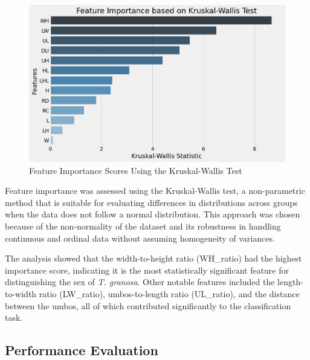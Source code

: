 \begin{figure}[!htbp]
	\centering
	\includegraphics[width=1.0\textwidth]{figures/kw.png}
	\caption{Feature Importance Scores Using the Kruskal-Wallis Test}
	\label{fig:kw}
\end{figure}

Feature importance was assessed using the Kruskal-Wallis test, a non-parametric method that is suitable for evaluating differences in distributions across groups when the data does not follow a normal distribution. This approach was chosen because of the non-normality of the dataset and its robustness in handling continuous and ordinal data without assuming homogeneity of variances. \cite{ribeiro2024}

The analysis showed that the width-to-height ratio (WH\_ratio) had the highest importance score, indicating it is the most statistically significant feature for distinguishing the sex of \textit{T. granosa}. Other notable features included the length-to-width ratio (LW\_ratio), umbos-to-length ratio (UL\_ratio), and the distance between the umbos, all of which contributed significantly to the classification task.

\subsection{Performance Evaluation}
\label{tab:performance-eval}

